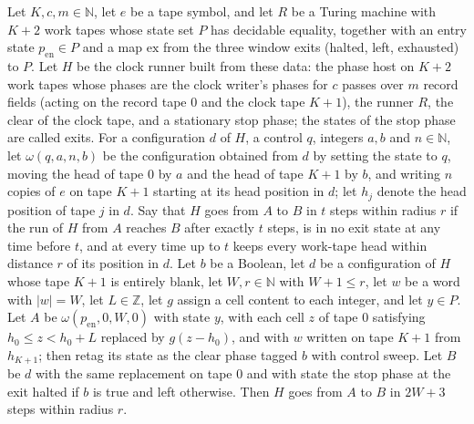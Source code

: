 \begin{lemma}
\label{Turing.cw_seg_clear}
\leanok
{}
Let $K,c,m\in\mathbb{N}$, let $e$ be a tape symbol, and let $R$ be a Turing machine with $K+2$
work tapes whose state set $P$ has decidable equality, together with an entry state
$p_{\mathrm{en}}\in P$ and a map $\mathrm{ex}$ from the three window exits (halted, left,
exhausted) to $P$. Let $H$ be the clock runner built from these data: the phase host on $K+2$
work tapes whose phases are the clock writer's phases for $c$ passes over $m$ record fields
(acting on the record tape $0$ and the clock tape $K+1$), the runner $R$, the clear of the
clock tape, and a stationary stop phase; the states of the stop phase are called exits. For a
configuration $d$ of $H$, a control $q$, integers $a,b$ and $n\in\mathbb{N}$, let
$\omega(q,a,n,b)$ be the configuration obtained from $d$ by setting the state to $q$, moving
the head of tape $0$ by $a$ and the head of tape $K+1$ by $b$, and writing $n$ copies of $e$ on
tape $K+1$ starting at its head position in $d$; let $h_j$ denote the head position of tape $j$
in $d$. Say that $H$ goes from $A$ to $B$ in $t$ steps within radius $r$ if the run of $H$ from
$A$ reaches $B$ after exactly $t$ steps, is in no exit state at any time before $t$, and at
every time up to $t$ keeps every work-tape head within distance $r$ of its position in $d$. Let
$b$ be a Boolean, let $d$ be a configuration of $H$ whose tape $K+1$ is entirely blank, let
$W,r\in\mathbb{N}$ with $W+1\le r$, let $w$ be a word with $|w|=W$, let $L\in\mathbb{Z}$, let
$g$ assign a cell content to each integer, and let $y\in P$. Let $A$ be
$\omega(p_{\mathrm{en}},0,W,0)$ with state $y$, with each cell $z$ of tape $0$ satisfying
$h_0\le z<h_0+L$ replaced by $g(z-h_0)$, and with $w$ written on tape $K+1$ from $h_{K+1}$;
then retag its state as the clear phase tagged $b$ with control sweep. Let $B$ be $d$ with the
same replacement on tape $0$ and with state the stop phase at the exit halted if $b$ is true
and left otherwise. Then $H$ goes from $A$ to $B$ in $2W+3$ steps within radius $r$.
\end{lemma}

